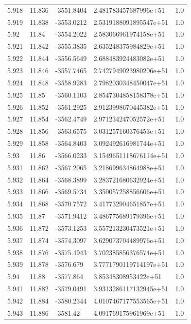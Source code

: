 \begin{tabular}{lllll}
5.918 & 11.836 & -3551.8404 & 2.481783457687996e+51 & 1.0 \\
5.919 & 11.838 & -3553.0212 & 2.5319188091895547e+51 & 1.0 \\
5.92 & 11.84 & -3554.2022 & 2.583066961974158e+51 & 1.0 \\
5.921 & 11.842 & -3555.3835 & 2.635248375984829e+51 & 1.0 \\
5.922 & 11.844 & -3556.5649 & 2.688483924483082e+51 & 1.0 \\
5.923 & 11.846 & -3557.7465 & 2.7427949023980206e+51 & 1.0 \\
5.924 & 11.848 & -3558.9283 & 2.7982030348450047e+51 & 1.0 \\
5.925 & 11.85 & -3560.1103 & 2.8547304858158378e+51 & 1.0 \\
5.926 & 11.852 & -3561.2925 & 2.9123998670445382e+51 & 1.0 \\
5.927 & 11.854 & -3562.4749 & 2.971234247052572e+51 & 1.0 \\
5.928 & 11.856 & -3563.6575 & 3.031257160376453e+51 & 1.0 \\
5.929 & 11.858 & -3564.8403 & 3.092492616981744e+51 & 1.0 \\
5.93 & 11.86 & -3566.0233 & 3.1549651118676114e+51 & 1.0 \\
5.931 & 11.862 & -3567.2065 & 3.218699634864988e+51 & 1.0 \\
5.932 & 11.864 & -3568.3899 & 3.283721680632924e+51 & 1.0 \\
5.933 & 11.866 & -3569.5734 & 3.350057258856606e+51 & 1.0 \\
5.934 & 11.868 & -3570.7572 & 3.417732904651857e+51 & 1.0 \\
5.935 & 11.87 & -3571.9412 & 3.486775689179396e+51 & 1.0 \\
5.936 & 11.872 & -3573.1253 & 3.557213230473521e+51 & 1.0 \\
5.937 & 11.874 & -3574.3097 & 3.629073704489976e+51 & 1.0 \\
5.938 & 11.876 & -3575.4943 & 3.702385856376574e+51 & 1.0 \\
5.939 & 11.878 & -3576.679 & 3.7771790119714197e+51 & 1.0 \\
5.94 & 11.88 & -3577.864 & 3.85348308953422e+51 & 1.0 \\
5.941 & 11.882 & -3579.0491 & 3.9313286117132945e+51 & 1.0 \\
5.942 & 11.884 & -3580.2344 & 4.0107467177553565e+51 & 1.0 \\
5.943 & 11.886 & -3581.42 & 4.091769175961969e+51 & 1.0 \\

\end{tabular}
